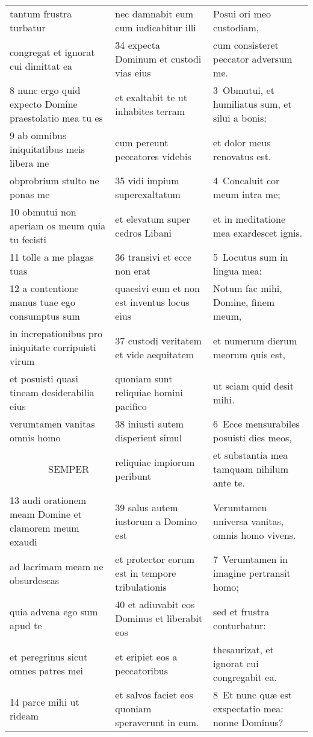 \documentclass{article}
\begin{document}
\begin{longtable}{@{}p{}p{}p{}@{}}
tantum frustra turbatur	&	nec damnabit eum cum iudicabitur illi	&	Posui ori meo custodiam,	\\
congregat et ignorat cui dimittat ea	&	34 expecta Dominum et custodi vias eius	&	cum consisteret peccator adversum me.	\\
8 nunc ergo quid expecto Domine praestolatio mea tu es	&	et exaltabit te ut inhabites terram	&	3 Obmutui, et humiliatus sum, et silui a bonis;	\\
9 ab omnibus iniquitatibus meis libera me	&	cum pereunt peccatores videbis	&	et dolor meus renovatus est.	\\
obprobrium stulto ne ponas me	&	35 vidi impium superexaltatum	&	4 Concaluit cor meum intra me;	\\
10 obmutui non aperiam os meum quia tu fecisti	&	et elevatum super cedros Libani	&	et in meditatione mea exardescet ignis.	\\
11 tolle a me plagas tuas	&	36 transivi et ecce non erat	&	5 Locutus sum in lingua mea:	\\
12 a contentione manus tuae ego consumptus sum	&	quaesivi eum et non est inventus locus eius	&	Notum fac mihi, Domine, finem meum,	\\
in increpationibus pro iniquitate corripuisti virum	&	37 custodi veritatem et vide aequitatem	&	et numerum dierum meorum quis est,	\\
et posuisti quasi tineam desiderabilia eius	&	quoniam sunt reliquiae homini pacifico	&	ut sciam quid desit mihi.	\\
verumtamen vanitas omnis homo	&	38 iniusti autem disperient simul	&	6 Ecce mensurabiles posuisti dies meos,	\\
    SEMPER	&	reliquiae impiorum peribunt	&	et substantia mea tamquam nihilum ante te.	\\
13 audi orationem meam Domine et clamorem meum exaudi	&	39 salus autem iustorum a Domino est	&	Verumtamen universa vanitas, omnis homo vivens.	\\
ad lacrimam meam ne obsurdescas	&	et protector eorum est in tempore tribulationis	&	7 Verumtamen in imagine pertransit homo;	\\
quia advena ego sum apud te	&	40 et adiuvabit eos Dominus et liberabit eos	&	sed et frustra conturbatur:	\\
et peregrinus sicut omnes patres mei	&	et eripiet eos a peccatoribus	&	thesaurizat, et ignorat cui congregabit ea.	\\
14 parce mihi ut rideam	&	et salvos faciet eos quoniam speraverunt in eum.	&	8 Et nunc quæ est exspectatio mea: nonne Dominus?	\\

\end{longtable}
\end{document}
